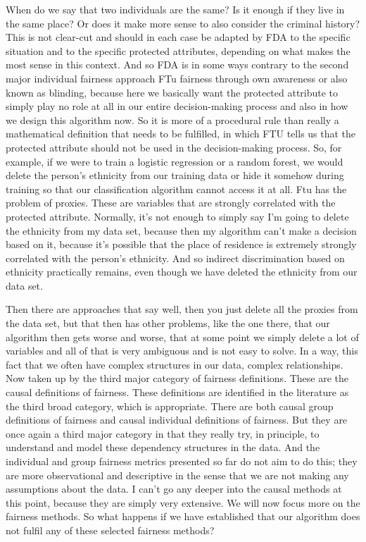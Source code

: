 When do we say that two individuals are the same? Is it enough if they live in the same place? Or does it make more sense to also consider the criminal history? This is not clear-cut and should in each case be adapted by FDA to the specific situation and to the specific protected attributes, depending on what makes the most sense in this context. And so FDA is in some ways contrary to the second major individual fairness approach FTu fairness through own awareness or also known as blinding, because here we basically want the protected attribute to simply play no role at all in our entire decision-making process and also in how we design this algorithm now. So it is more of a procedural rule than really a mathematical definition that needs to be fulfilled, in which FTU tells us that the protected attribute should not be used in the decision-making process. So, for example, if we were to train a logistic regression or a random forest, we would delete the person's ethnicity from our training data or hide it somehow during training so that our classification algorithm cannot access it at all. Ftu has the problem of proxies. These are variables that are strongly correlated with the protected attribute. Normally, it's not enough to simply say I'm going to delete the ethnicity from my data set, because then my algorithm can't make a decision based on it, because it's possible that the place of residence is extremely strongly correlated with the person's ethnicity. And so indirect discrimination based on ethnicity practically remains, even though we have deleted the ethnicity from our data set.

Then there are approaches that say well, then you just delete all the proxies from the data set, but that then has other problems, like the one there, that our algorithm then gets worse and worse, that at some point we simply delete a lot of variables and all of that is very ambiguous and is not easy to solve. In a way, this fact that we often have complex structures in our data, complex relationships. Now taken up by the third major category of fairness definitions. These are the causal definitions of fairness. These definitions are identified in the literature as the third broad category, which is appropriate. There are both causal group definitions of fairness and causal individual definitions of fairness. But they are once again a third major category in that they really try, in principle, to understand and model these dependency structures in the data. And the individual and group fairness metrics presented so far do not aim to do this; they are more observational and descriptive in the sense that we are not making any assumptions about the data. I can't go any deeper into the causal methods at this point, because they are simply very extensive. We will now focus more on the fairness methods. So what happens if we have established that our algorithm does not fulfil any of these selected fairness methods?

